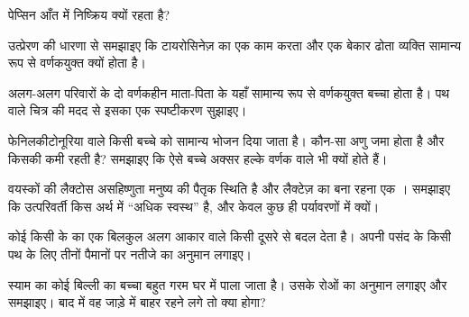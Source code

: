 \begin{exercise}[$\star$]\label{exo:g11:enzymes-and-phenotype:5}
पेप्सिन आँत में निष्क्रिय क्यों रहता है?
\end{exercise}

\begin{exercise}[$\star\star$]\label{exo:g11:enzymes-and-phenotype:6}
उत्प्रेरण की धारणा से समझाइए कि टायरोसिनेज़  का एक काम करता और एक बेकार
 ढोता व्यक्ति सामान्य रूप से वर्णकयुक्त क्यों होता है।
\end{exercise}

\begin{exercise}[$\star\star$]\label{exo:g11:enzymes-and-phenotype:7}
अलग-अलग परिवारों के दो वर्णकहीन माता-पिता के यहाँ सामान्य रूप से वर्णकयुक्त
बच्चा होता है। पथ वाले चित्र की मदद से इसका एक स्पष्टीकरण सुझाइए।
\end{exercise}

\begin{exercise}[$\star\star$]\label{exo:g11:enzymes-and-phenotype:8}
फेनिलकीटोनूरिया वाले किसी बच्चे को सामान्य भोजन दिया जाता है। कौन-सा अणु
जमा होता है और किसकी कमी रहती है? समझाइए कि ऐसे बच्चे अक्सर हल्के
वर्णक वाले भी क्यों होते हैं।
\end{exercise}

\begin{exercise}[$\star\star$]\label{exo:g11:enzymes-and-phenotype:9}
वयस्कों की लैक्टोस असहिष्णुता मनुष्य की पैतृक स्थिति है और लैक्टेज़ का बना
रहना एक । समझाइए कि उत्परिवर्ती  किस अर्थ में
``अधिक स्वस्थ'' है, और केवल कुछ ही पर्यावरणों में क्यों।
\end{exercise}

\begin{exercise}[$\star\star$]\label{exo:g11:enzymes-and-phenotype:10}
कोई  किसी  के  का एक  बिलकुल अलग आकार
वाले किसी दूसरे से बदल देता है। अपनी पसंद के किसी पथ के लिए तीनों पैमानों
पर नतीजे का अनुमान लगाइए।
\end{exercise}

\begin{exercise}[$\star\star$]\label{exo:g11:enzymes-and-phenotype:11}
स्याम का कोई बिल्ली का बच्चा बहुत गरम घर में पाला जाता है। उसके रोओं का
अनुमान लगाइए और समझाइए। बाद में वह जाड़े में बाहर रहने लगे तो क्या होगा?
\end{exercise}

